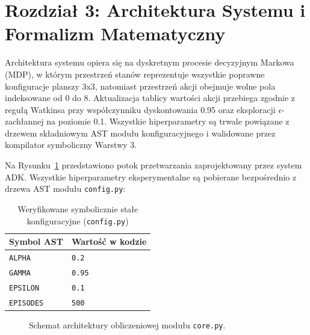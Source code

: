 \documentclass[11pt,a4paper]{article}
\begin{document}
\section{Rozdział 3: Architektura Systemu i Formalizm Matematyczny}
Architektura systemu opiera się na dyskretnym procesie decyzyjnym Markowa (MDP), w którym przestrzeń stanów reprezentuje wszystkie poprawne konfiguracje planszy 3x3, natomiast przestrzeń akcji obejmuje wolne pola indeksowane od 0 do 8. Aktualizacja tablicy wartości akcji przebiega zgodnie z regułą Watkinsa \cite{watkins1992qlearning} przy współczynniku dyskontowania 0.95 oraz eksploracji $\epsilon$-zachłannej na poziomie 0.1. Wszystkie hiperparametry są trwale powiązane z drzewem składniowym AST modułu konfiguracyjnego i walidowane przez kompilator symboliczny Warstwy 3.

Na Rysunku~\ref{fig:arch_tikz} przedstawiono potok przetwarzania zaprojektowany przez system ADK.
Wszystkie hiperparametry eksperymentalne są pobierane bezpośrednio z drzewa AST modułu \texttt{config.py}:

\begin{table}[htbp]
\centering
\caption{Weryfikowane symbolicznie stałe konfiguracyjne (\texttt{config.py})}
\begin{tabular}{ll}
\toprule
\textbf{Symbol AST} & \textbf{Wartość w kodzie} \\
\midrule
\texttt{ALPHA} & \texttt{0.2} \\
\texttt{GAMMA} & \texttt{0.95} \\
\texttt{EPSILON} & \texttt{0.1} \\
\texttt{EPISODES} & \texttt{500} \\
\bottomrule
\end{tabular}
\end{table}

\begin{figure}[htbp]
\centering
{}
\caption{Schemat architektury obliczeniowej modułu \texttt{core.py}.}
\label{fig:arch_tikz}
\end{figure}
\end{document}
